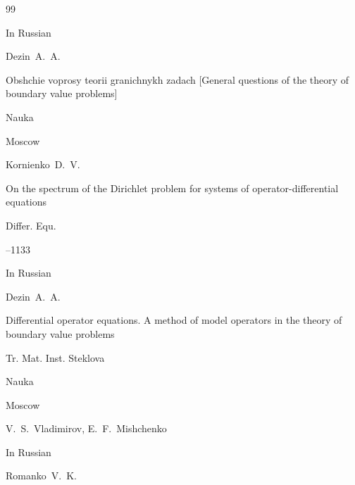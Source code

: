 \begin{thebibliography}{99}




\lang In Russian

\by Dezin~A.~A.

\book Obshchie voprosy teorii granichnykh zadach \rm [General questions of the theory of boundary value problems]


\publ Nauka

\publaddr Moscow








\by Kornienko~D.~V.

\paper On the spectrum of the Dirichlet problem for systems of operator-differential equations

\jour Differ. Equ.




--1133









\lang In Russian

\by Dezin~A.~A.

\book Differential operator equations. A method of model operators in the theory of boundary value problems

\serial Tr. Mat. Inst. Steklova



\publ Nauka

\publaddr Moscow

\ed V.~S.~Vladimirov, E.~F.~Mishchenko







\lang In Russian

\by Romanko~V.~K.


\end{thebibliography}
